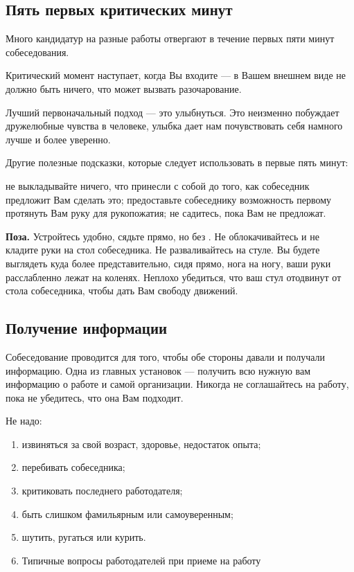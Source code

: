 \subsection{Пять первых критических минут}
Много кандидатур на разные работы отвергают в течение первых пяти минут собеседования.

Критический момент наступает, когда Вы входите --- в Вашем внешнем виде не должно быть ничего, что может вызвать разочарование.

Лучший первоначальный подход --- это улыбнуться. Это неизменно побуждает дружелюбные чувства в человеке, улыбка дает нам почувствовать себя намного лучше и более уверенно.

Другие полезные подсказки, которые следует использовать в первые пять минут:

не выкладывайте ничего, что принесли с собой до того, как собеседник предложит Вам сделать это;
предоставьте собеседнику возможность первому протянуть Вам руку для рукопожатия;
не садитесь, пока Вам не предложат.


\textbf{Поза.}
Устройтесь удобно, сядьте прямо, но без .
Не облокачивайтесь и не кладите руки на стол собеседника.
Не разваливайтесь на стуле.
Вы будете выглядеть куда более представительно, сидя прямо, нога на ногу, ваши руки расслабленно лежат на коленях. Неплохо убедиться, что ваш стул отодвинут от стола собеседника, чтобы дать Вам свободу движений.


\subsection{Получение информации}
Собеседование проводится для того, чтобы обе стороны давали и получали информацию. Одна из главных установок --- получить всю нужную вам информацию о работе и самой организации. Никогда не соглашайтесь на работу, пока не убедитесь, что она Вам подходит.

Не надо:
\begin{enumerate}[noitemsep]
    \item извиняться за свой возраст, здоровье, недостаток опыта;
    \item перебивать собеседника;
    \item критиковать последнего работодателя;
    \item быть слишком фамильярным или самоуверенным;
    \item шутить, ругаться или курить.
    \item Типичные вопросы работодателей при приеме на работу
\end{enumerate}


